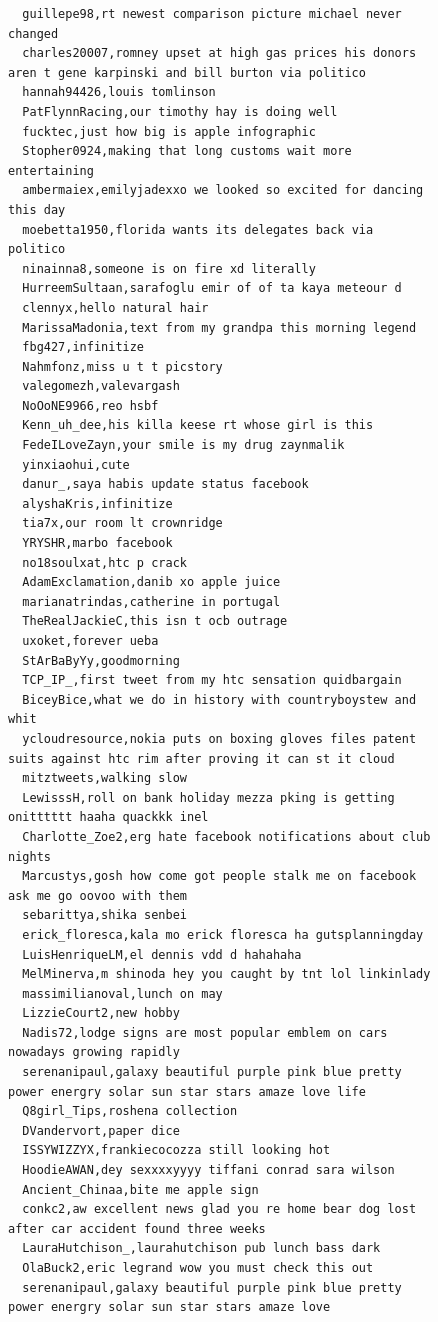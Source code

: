 \begin{figure}[htpb]
\begin{verbatim}
  guillepe98,rt newest comparison picture michael never changed
  charles20007,romney upset at high gas prices his donors aren t gene karpinski and bill burton via politico
  hannah94426,louis tomlinson
  PatFlynnRacing,our timothy hay is doing well
  fucktec,just how big is apple infographic
  Stopher0924,making that long customs wait more entertaining
  ambermaiex,emilyjadexxo we looked so excited for dancing this day
  moebetta1950,florida wants its delegates back via politico
  ninainna8,someone is on fire xd literally
  HurreemSultaan,sarafoglu emir of of ta kaya meteour d
  clennyx,hello natural hair
  MarissaMadonia,text from my grandpa this morning legend
  fbg427,infinitize
  Nahmfonz,miss u t t picstory
  valegomezh,valevargash
  NoOoNE9966,reo hsbf
  Kenn_uh_dee,his killa keese rt whose girl is this
  FedeILoveZayn,your smile is my drug zaynmalik
  yinxiaohui,cute
  danur_,saya habis update status facebook
  alyshaKris,infinitize
  tia7x,our room lt crownridge
  YRYSHR,marbo facebook
  no18soulxat,htc p crack
  AdamExclamation,danib xo apple juice
  marianatrindas,catherine in portugal
  TheRealJackieC,this isn t ocb outrage
  uxoket,forever ueba
  StArBaByYy,goodmorning
  TCP_IP_,first tweet from my htc sensation quidbargain
  BiceyBice,what we do in history with countryboystew and whit
  ycloudresource,nokia puts on boxing gloves files patent suits against htc rim after proving it can st it cloud
  mitztweets,walking slow
  LewisssH,roll on bank holiday mezza pking is getting onitttttt haaha quackkk inel
  Charlotte_Zoe2,erg hate facebook notifications about club nights
  Marcustys,gosh how come got people stalk me on facebook ask me go oovoo with them
  sebarittya,shika senbei
  erick_floresca,kala mo erick floresca ha gutsplanningday
  LuisHenriqueLM,el dennis vdd d hahahaha
  MelMinerva,m shinoda hey you caught by tnt lol linkinlady
  massimilianoval,lunch on may
  LizzieCourt2,new hobby
  Nadis72,lodge signs are most popular emblem on cars nowadays growing rapidly
  serenanipaul,galaxy beautiful purple pink blue pretty power energry solar sun star stars amaze love life
  Q8girl_Tips,roshena collection
  DVandervort,paper dice
  ISSYWIZZYX,frankiecocozza still looking hot
  HoodieAWAN,dey sexxxxyyyy tiffani conrad sara wilson
  Ancient_Chinaa,bite me apple sign
  conkc2,aw excellent news glad you re home bear dog lost after car accident found three weeks
  LauraHutchison_,laurahutchison pub lunch bass dark
  OlaBuck2,eric legrand wow you must check this out
  serenanipaul,galaxy beautiful purple pink blue pretty power energry solar sun star stars amaze love

\end{verbatim}
\end{figure}
